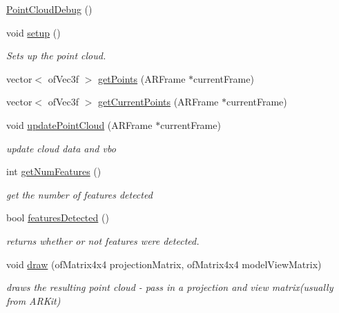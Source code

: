 \begin{DoxyCompactItemize}
\item 
\hyperlink{class_a_r_debug_utils_1_1_point_cloud_debug_a7de6576b45c662cddc632e7b9d7c9bd7}{Point\+Cloud\+Debug} ()
\item 
void \hyperlink{class_a_r_debug_utils_1_1_point_cloud_debug_a04e1ac43f026e32bb5b4877d41d69528}{setup} ()
\begin{DoxyCompactList}\small\item\em Sets up the point cloud. \end{DoxyCompactList}\item 
vector$<$ of\+Vec3f $>$ \hyperlink{class_a_r_debug_utils_1_1_point_cloud_debug_abf68c97daba914eb42e084234ca4c980}{get\+Points} (A\+R\+Frame $\ast$current\+Frame)
\item 
vector$<$ of\+Vec3f $>$ \hyperlink{class_a_r_debug_utils_1_1_point_cloud_debug_a62e8829bd3cdcc822fda0962e1abcac9}{get\+Current\+Points} (A\+R\+Frame $\ast$current\+Frame)
\item 
void \hyperlink{class_a_r_debug_utils_1_1_point_cloud_debug_a02a8d4c24ec4b19c238288874a568a9f}{update\+Point\+Cloud} (A\+R\+Frame $\ast$current\+Frame)
\begin{DoxyCompactList}\small\item\em update cloud data and vbo \end{DoxyCompactList}\item 
int \hyperlink{class_a_r_debug_utils_1_1_point_cloud_debug_a0757ac82a88433c519ec6362ac8cd251}{get\+Num\+Features} ()
\begin{DoxyCompactList}\small\item\em get the number of features detected \end{DoxyCompactList}\item 
bool \hyperlink{class_a_r_debug_utils_1_1_point_cloud_debug_abfaa58360f92ad1b41692175107c99a8}{features\+Detected} ()
\begin{DoxyCompactList}\small\item\em returns whether or not features were detected. \end{DoxyCompactList}\item 
void \hyperlink{class_a_r_debug_utils_1_1_point_cloud_debug_a308b87459dd4f0fc89f25bc65ad7b383}{draw} (of\+Matrix4x4 projection\+Matrix, of\+Matrix4x4 model\+View\+Matrix)
\begin{DoxyCompactList}\small\item\em draws the resulting point cloud -\/ pass in a projection and view matrix(usually from A\+R\+Kit) \end{DoxyCompactList}\end{DoxyCompactItemize}
